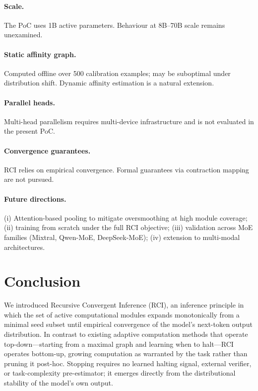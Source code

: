 \documentclass{article}
\begin{document}
\paragraph{Scale.}
The PoC uses 1B active parameters.
Behaviour at 8B--70B scale remains unexamined.

\paragraph{Static affinity graph.}
Computed offline over 500 calibration examples; may be suboptimal
under distribution shift.
Dynamic affinity estimation is a natural extension.

\paragraph{Parallel heads.}
Multi-head parallelism requires multi-device infrastructure and
is not evaluated in the present PoC.

\paragraph{Convergence guarantees.}
RCI relies on empirical convergence.
Formal guarantees via contraction mapping are not pursued.

\paragraph{Future directions.}
(i) Attention-based pooling to mitigate oversmoothing at high
module coverage;
(ii) training from scratch under the full RCI objective;
(iii) validation across MoE families (Mixtral, Qwen-MoE,
DeepSeek-MoE);
(iv) extension to multi-modal architectures.

\section{Conclusion}
\label{sec:conclusion}

We introduced Recursive Convergent Inference (RCI), an inference
principle in which the set of active computational modules expands
monotonically from a minimal seed subset until empirical
convergence of the model's next-token output distribution.
In contrast to existing adaptive computation methods that operate
top-down---starting from a maximal graph and learning when to
halt---RCI operates bottom-up, growing computation as warranted
by the task rather than pruning it post-hoc.
Stopping requires no learned halting signal, external verifier,
or task-complexity pre-estimator; it emerges directly from the
distributional stability of the model's own output.
\end{document}
